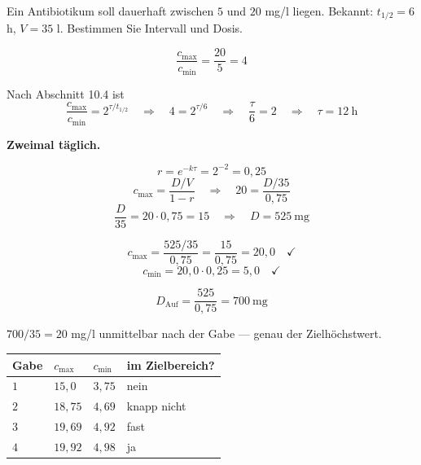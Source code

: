 \begin{aufgabe}
Ein Antibiotikum soll dauerhaft zwischen $5$ und $20$ mg/l liegen. Bekannt: $t_{1/2} = 6$ h, $V = 35$ l. Bestimmen Sie Intervall und Dosis.

\loesung
{}
\[ \frac{c_{\max}}{c_{\min}} = \frac{20}{5} = 4 \]

Nach Abschnitt 10.4 ist
\[ \frac{c_{\max}}{c_{\min}} = 2^{\tau/t_{1/2}} \quad\Longrightarrow\quad 4 = 2^{\tau/6} \quad\Longrightarrow\quad \frac{\tau}{6} = 2 \quad\Longrightarrow\quad \tau = 12\ \mathrm{h} \]

\textbf{Zweimal täglich.}

\[ r = e^{-k\tau} = 2^{-2} = 0{,}25 \]
\[ c_{\max} = \frac{D/V}{1-r} \quad\Longrightarrow\quad 20 = \frac{D/35}{0{,}75} \]
\[ \frac{D}{35} = 20 \cdot 0{,}75 = 15 \quad\Longrightarrow\quad D = 525\ \mathrm{mg} \]

\[ c_{\max} = \frac{525/35}{0{,}75} = \frac{15}{0{,}75} = 20{,}0 \quad \checkmark \]
\[ c_{\min} = 20{,}0 \cdot 0{,}25 = 5{,}0 \quad \checkmark \]

\[ D_{\text{Auf}} = \frac{525}{0{,}75} = 700\ \mathrm{mg} \]

 $700/35 = 20$ mg/l unmittelbar nach der Gabe --- genau der Zielhöchstwert. \checkmark

\begin{center}
\renewcommand{\arraystretch}{1.42}
\begin{tabular}{@{}P{1.4cm}P{1.8cm}P{1.8cm}P{2.2cm}@{}}
\toprule
\textbf{Gabe} & $c_{\max}$ & $c_{\min}$ & \textbf{im Zielbereich?}\\
\midrule
$1$ & $15{,}0$ & $3{,}75$ & \textcolor{akzent}{nein}\\
$2$ & $18{,}75$ & $4{,}69$ & \textcolor{akzent}{knapp nicht}\\
$3$ & $19{,}69$ & $4{,}92$ & \textcolor{mittel}{fast}\\
$4$ & $19{,}92$ & $4{,}98$ & \textcolor{gruen}{ja}\\
\bottomrule
\end{tabular}
\end{center}

\begin{center}
\begin{minipage}{0.88\textwidth}
\end{minipage}
\end{center}


\end{aufgabe}
